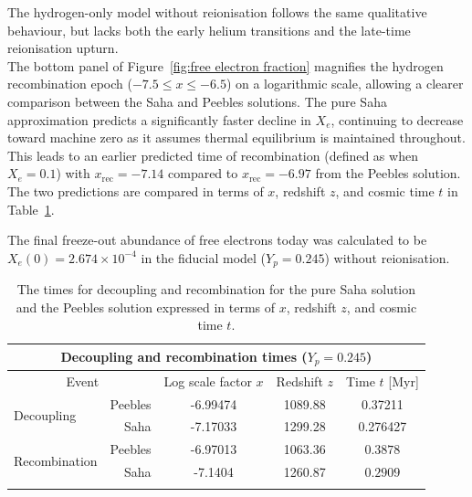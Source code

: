 \documentclass[twocolumn]{aa}
\begin{document}
The hydrogen-only model without reionisation follows the same qualitative behaviour, but lacks both the early helium transitions and the late-time reionisation upturn.\\

The bottom panel of Figure~\ref{fig:free electron fraction} magnifies the hydrogen recombination epoch ($-7.5 \leq x \leq -6.5$) on a logarithmic scale, allowing a clearer comparison between the Saha and Peebles solutions. The pure Saha approximation predicts a significantly faster decline in $X_e$, continuing to decrease toward machine zero as it assumes thermal equilibrium is maintained throughout. This leads to an earlier predicted time of recombination (defined as when $X_e = 0.1$) with $x_\mathrm{rec} = -7.14$ compared to $x_\mathrm{rec} = -6.97$ from the Peebles solution. The two predictions are compared in terms of $x$, redshift $z$, and cosmic time $t$ in Table~\ref{tab:recombination history}.

The final freeze-out abundance of free electrons today was calculated to be $X_e(0) = 2.674\times 10^{-4}$ in the fiducial model ($Y_p=0.245$) without reionisation.

\begin{table}
\centering
\begin{minipage}{0.8\textwidth}
      \centering
      \renewcommand{\arraystretch}{1.3}
      \begin{tabular}{l|r|c|c|c}
            \hline\hline
            \multicolumn{5}{c}{Decoupling and recombination times ($Y_p=0.245$)}\\
            \hline
            \multicolumn{2}{c|}{Event} & Log scale factor $x$ & Redshift $z$& Time $t$ [Myr]\\
            \hline
            \multirow{2}{*}{Decoupling}   & Peebles & -6.99474 & 1089.88 & 0.37211\\
                                          & Saha & -7.17033 & 1299.28 & 0.276427\\
            \hline
            \multirow{2}{*}{Recombination}& Peebles & -6.97013 & 1063.36 & $0.3878$\\
                                          & Saha & -7.1404 & 1260.87 & $0.2909$\\
            \hline\hline
            \multicolumn{5}{c}{}
      \end{tabular}
      \caption{The times for decoupling and recombination for the pure Saha solution and the Peebles solution expressed in terms of $x$, redshift $z$, and cosmic time $t$.}
      \label{tab:recombination history}
\end{minipage}
\end{table}
\end{document}
